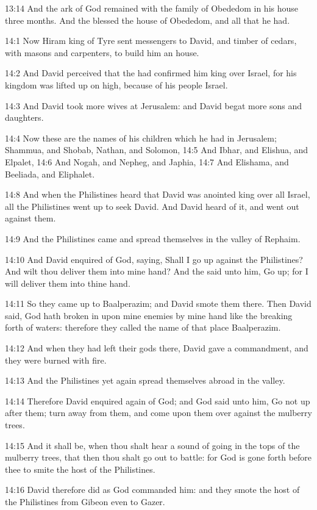 13:14 And the ark of God remained with the family of Obededom in his house three months. And the \LORD blessed the house of Obededom, and all that he had.

14:1 Now Hiram king of Tyre sent messengers to David, and timber of cedars, with masons and carpenters, to build him an house.

14:2 And David perceived that the \LORD had confirmed him king over Israel, for his kingdom was lifted up on high, because of his people Israel.

14:3 And David took more wives at Jerusalem: and David begat more sons and daughters.

14:4 Now these are the names of his children which he had in Jerusalem; Shammua, and Shobab, Nathan, and Solomon, 14:5 And Ibhar, and Elishua, and Elpalet, 14:6 And Nogah, and Nepheg, and Japhia, 14:7 And Elishama, and Beeliada, and Eliphalet.

14:8 And when the Philistines heard that David was anointed king over all Israel, all the Philistines went up to seek David. And David heard of it, and went out against them.

14:9 And the Philistines came and spread themselves in the valley of Rephaim.

14:10 And David enquired of God, saying, Shall I go up against the Philistines? And wilt thou deliver them into mine hand? And the \LORD said unto him, Go up; for I will deliver them into thine hand.

14:11 So they came up to Baalperazim; and David smote them there. Then David said, God hath broken in upon mine enemies by mine hand like the breaking forth of waters: therefore they called the name of that place Baalperazim.

14:12 And when they had left their gods there, David gave a commandment, and they were burned with fire.

14:13 And the Philistines yet again spread themselves abroad in the valley.

14:14 Therefore David enquired again of God; and God said unto him, Go not up after them; turn away from them, and come upon them over against the mulberry trees.

14:15 And it shall be, when thou shalt hear a sound of going in the tops of the mulberry trees, that then thou shalt go out to battle: for God is gone forth before thee to smite the host of the Philistines.

14:16 David therefore did as God commanded him: and they smote the host of the Philistines from Gibeon even to Gazer.

